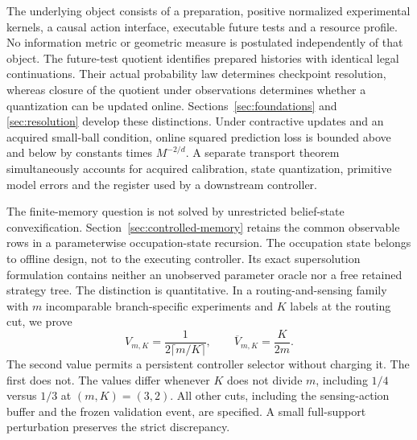 The underlying object consists of a preparation, positive normalized
experimental kernels, a causal action interface, executable future tests
and a resource profile. No information metric or geometric measure is
postulated independently of that object. The future-test quotient
identifies prepared histories with identical legal continuations.
Their actual probability law determines checkpoint resolution, whereas
closure of the quotient under observations determines whether a
quantization can be updated online. Sections~\ref{sec:foundations}
and \ref{sec:resolution} develop these distinctions. Under contractive
updates and an acquired small-ball condition, online squared prediction
loss is bounded above and below by constants times $M^{-2/d}$.
A separate transport theorem simultaneously accounts for acquired
calibration, state quantization, primitive model errors and the
register used by a downstream controller.

The finite-memory question is not solved by unrestricted belief-state
convexification. Section~\ref{sec:controlled-memory} retains the common
observable rows in a parameterwise occupation-state recursion. The
occupation state belongs to offline design, not to the executing
controller. Its exact supersolution formulation contains neither an
unobserved parameter oracle nor a free retained strategy tree.
The distinction is quantitative. In a routing-and-sensing family with
$m$ incomparable branch-specific experiments and $K$ labels at the
routing cut, we prove
\[
 V_{m,K}=\frac1{2\lceil m/K\rceil},\qquad
 \overline V_{m,K}=\frac K{2m}.
\]
The second value permits a persistent controller selector without
charging it. The first does not. The values differ whenever $K$ does
not divide $m$, including $1/4$ versus $1/3$ at $(m,K)=(3,2)$.
All other cuts, including the sensing-action buffer and the frozen
validation event, are specified. A small full-support perturbation
preserves the strict discrepancy.

